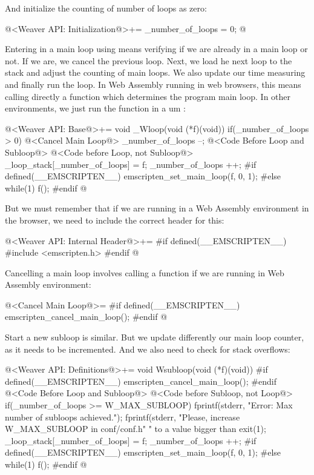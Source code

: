 And initialize the counting of number of loops as zero:

\iniciocodigo
@<Weaver API: Initialization@>+=
_number_of_loops = 0;
@
\fimcodigo

Entering in a main loop using  means verifying if we
are already in a main loop or not. If we are, we cancel the previous
loop. Next, we load he next loop to the stack and adjust the counting
of main loops. We also update our time measuring and finally run the
loop. In Web Assembly running in web browsers, this means calling
directly a function which determines the program main loop. In other
environments, we just run the function in a um :

\iniciocodigo
@<Weaver API: Base@>+=
void _Wloop(void (*f)(void)){
  if(_number_of_loops > 0){
    @<Cancel Main Loop@>
    _number_of_loops --;
  }
  @<Code Before Loop and Subloop@>
  @<Code before Loop, not Subloop@>
  _loop_stack[_number_of_loops] = f;
  _number_of_loops ++;
#if defined(__EMSCRIPTEN__)
  emscripten_set_main_loop(f, 0, 1);
#else
  while(1)
    f();
#endif
}
@
\fimcodigo

But we must remember that if we are running in a Web Assembly
environment in the browser, we need to include the correct header for
this:

\iniciocodigo
@<Weaver API: Internal Header@>+=
#if defined(__EMSCRIPTEN__)
#include <emscripten.h>
#endif
@
\fimcodigo


Cancelling a main loop involves calling a function if we are running
in Web Assembly environment:

\iniciocodigo
@<Cancel Main Loop@>=
#if defined(__EMSCRIPTEN__)
emscripten_cancel_main_loop();
#endif
@
\fimcodigo

Start a new subloop is similar. But we update differently our main
loop counter, as it needs to be incremented. And we also need to check
for stack overflows:

\iniciocodigo
@<Weaver API: Definitions@>+=
void Wsubloop(void (*f)(void)){
#if defined(__EMSCRIPTEN__)
    emscripten_cancel_main_loop();
#endif
  @<Code Before Loop and Subloop@>
  @<Code before Subloop, not Loop@>
  if(_number_of_loops >= W_MAX_SUBLOOP){
    fprintf(stderr, "Error: Max number of subloops achieved.\n");
    fprintf(stderr, "Please, increase W_MAX_SUBLOOP in conf/conf.h"
            " to a value bigger than %
    exit(1);
  }
  _loop_stack[_number_of_loops] = f;
  _number_of_loops ++;
#if defined(__EMSCRIPTEN__)
  emscripten_set_main_loop(f, 0, 1);
#else
  while(1)
    f();
#endif
}
@
\fimcodigo

